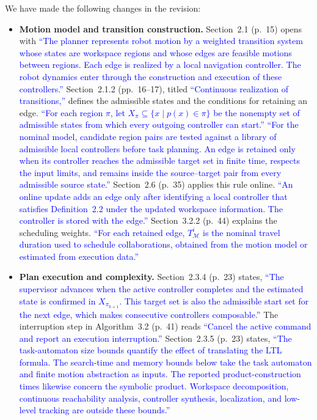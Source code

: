 \documentclass[11pt]{article}
\newcommand{\change}[1]{\textcolor{blue}{#1}}
\begin{document}
We have made the following changes in the revision:
\begin{itemize}
\item \textbf{Motion model and transition construction.}
Section~2.1 (p.~15) opens with
\change{``The planner represents robot motion by a weighted transition system whose
states are workspace regions and whose edges are feasible motions between regions.
Each edge is realized by a local navigation controller. The robot dynamics enter
through the construction and execution of these controllers.''}
Section~2.1.2 (pp.~16--17), titled \change{``Continuous realization of transitions,''}
defines the admissible states and the conditions for retaining an edge.
\change{``For each region $\pi$, let $X_\pi\subseteq\{x\mid p(x)\in\pi\}$ be the
nonempty set of admissible states from which every outgoing controller can start.''}
\change{``For the nominal model, candidate region pairs are tested against a library
of admissible local controllers before task planning. An edge is retained only when
its controller reaches the admissible target set in finite time, respects the input
limits, and remains inside the source--target pair from every admissible source state.''}
Section~2.6 (p.~35) applies this rule online.
\change{``An online update adds an edge only after identifying a local controller
that satisfies Definition~2.2 under the updated workspace information. The controller
is stored with the edge.''}
Section~3.2.2 (p.~44) explains the scheduling weights.
\change{``For each retained edge, $T_{\mathcal{M}}^i$ is the nominal travel duration
used to schedule collaborations, obtained from the motion model or estimated from
execution data.''}

\item \textbf{Plan execution and complexity.} Section~2.3.4 (p.~23) states,
\change{``The supervisor advances when the active controller completes and the
estimated state is confirmed in $X_{\pi_{k+1}}$. This target set is also the
admissible start set for the next edge, which makes consecutive controllers
composable.''}
The interruption step in Algorithm~3.2 (p.~41) reads
\change{``Cancel the active command and report an execution interruption.''}
Section~2.3.5 (p.~23) states,
\change{``The task-automaton size bounds quantify the effect of translating the
LTL formula. The search-time and memory bounds below take the task automaton
and finite motion abstraction as inputs. The reported product-construction
times likewise concern the symbolic product. Workspace decomposition,
continuous reachability analysis, controller synthesis, localization, and
low-level tracking are outside these bounds.''}
\end{itemize}
\end{document}
